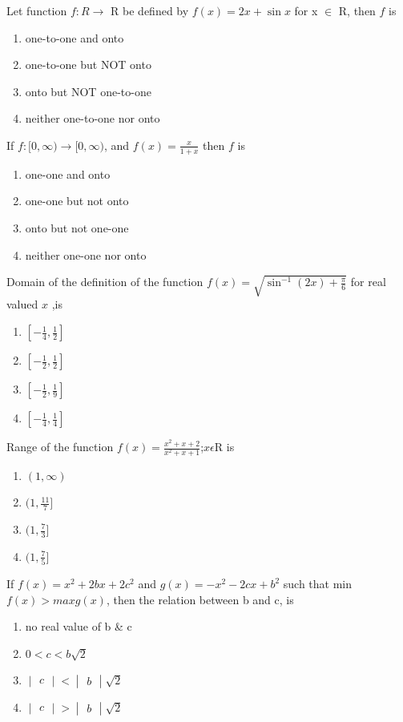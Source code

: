 \item Let function $f: R \rightarrow$ R be defined by $f(x) = 2x+\sin x$ for x $\in$ R, then $f$ is
\begin{enumerate}
\item one-to-one and onto
\item one-to-one but NOT onto
\item onto but NOT one-to-one
\item neither one-to-one nor onto
\end{enumerate}

\item If $f: [0,\infty) \rightarrow [0,\infty)$, and $f(x)=\frac{x}{1+x}$ then $f$ is
\begin{enumerate}
\item one-one and onto
\item one-one but not onto
\item onto but not one-one
\item neither one-one nor onto
\end{enumerate}

\item Domain of the definition of the function $f(x)=\sqrt{\sin^{-1}(2x)+\frac{\pi}{6}}$ for real valued $x$ ,is
\begin{enumerate}
\item $[-\frac{1}{4},\frac{1}{2}]$
\item $[-\frac{1}{2},\frac{1}{2}]$
\item $[-\frac{1}{2},\frac{1}{9}]$
\item $[-\frac{1}{4},\frac{1}{4}]$
\end{enumerate}

\item Range of the function $f(x)=\frac{x^2+x+2}{x^2+x+1}$;$x\epsilon$R is
\begin{enumerate}
\item $(1,\infty)$
\item $(1,\frac{11}{7}]$
\item $(1,\frac{7}{3}]$
\item $(1,\frac{7}{5}]$
\end{enumerate}

\item If $f(x)=x^{2}+2bx+2c^{2}$ and $g(x)=-x^{2}-2cx+b^{2}$ such that min $f(x) > max g(x)$, then the relation between b and c, is
\begin{enumerate}
\item no real value of b \& c
\item $0<c<b\sqrt{2}$
\item $\begin{vmatrix} c \end{vmatrix} < \begin{vmatrix} b\end{vmatrix} \sqrt{2}$
\item $\begin{vmatrix} c \end{vmatrix} > \begin{vmatrix} b\end{vmatrix} \sqrt{2}$
\end{enumerate}

